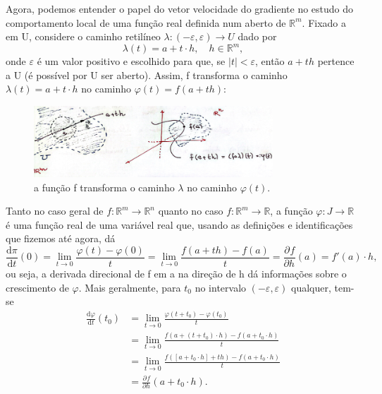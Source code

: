 \documentclass[../analysisII_notes.tex]{subfiles}
\begin{document}
Agora, podemos entender o papel do vetor velocidade do gradiente no estudo do comportamento local de uma função real definida num aberto de \(\mathbb{R}^{m}.\) Fixado a em U, considere o caminho retilíneo \(\lambda :(-\varepsilon , \varepsilon )\rightarrow U\) dado por
\[
	\lambda (t)=a+t \cdot h,\quad h\in \mathbb{R}^{m},
\]
onde \(\varepsilon \) é um valor positivo e escolhido para que, se \(|t|<\varepsilon \), então \(a+th\) pertence a U (é possível por U ser aberto). Assim, f transforma o caminho \(\lambda(t)=a+t \cdot h\) no caminho \(\varphi (t)=f(a+th)\):
\begin{figure}[H]
	\begin{center}
		\includegraphics[height=0.8\textheight, width=0.8\textwidth, keepaspectratio]{./Images/f_to_phi_25.png}
	\end{center}
	\caption{a função f transforma o caminho \(\lambda \) no caminho \(\varphi (t)\).}
\end{figure}
Tanto no caso geral de \(f:\mathbb{R}^{m}\rightarrow \mathbb{R}^{n}\) quanto no caso \(f:\mathbb{R}^{m}\rightarrow \mathbb{R}\), a função \(\varphi:J\rightarrow \mathbb{R} \) é uma função real de uma variável real que, usando as definições e identificações que fizemos até agora, dá
\[
	\frac{\mathrm{d}\pi }{\mathrm{d}t}(0) = \lim_{t\to 0}\frac{\varphi (t)-\varphi (0)}{t} = \lim_{t\to 0}\frac{f(a+th)-f(a)}{t} = \frac{\partial^{}f}{\partial h^{}}(a)=f'(a)\cdot h,
\]
ou seja, a derivada direcional de f em a na direção de h dá informações sobre o crescimento de \(\varphi \). Mais geralmente, para \(t_{0}\) no intervalo \((-\varepsilon , \varepsilon )\) qualquer, tem-se
\begin{align*}
	\frac{\mathrm{d}\varphi }{\mathrm{d}t}(t_{0}) & = \lim_{t\to 0}\frac{\varphi (t+t_{0})-\varphi(t_{0})}{t}          \\
	                                              & = \lim_{t\to 0}\frac{f(a+(t+t_{0})\cdot h)-f(a+t_{0}\cdot h)}{t}   \\
	                                              & = \lim_{t\to 0}\frac{f([a+t_{0}\cdot h]+th) -f(a+t_{0}\cdot h)}{t} \\
	                                              & = \frac{\partial^{}f}{\partial h^{}}(a+t_{0}\cdot h).
\end{align*}
\end{document}
